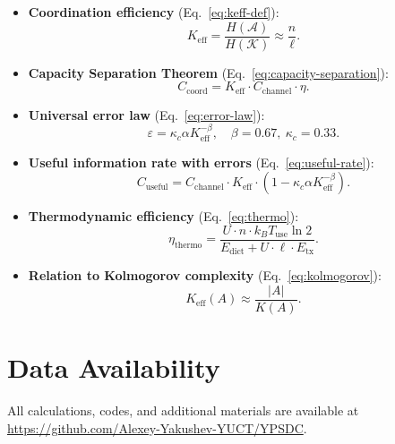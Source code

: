 \documentclass[12pt,a4paper]{article}
\theoremstyle{remark}
\newcommand{\Keff}{K_{\mathrm{eff}}}
\begin{document}
	\begin{itemize}
		\item \textbf{Coordination efficiency} (Eq.~\eqref{eq:keff-def}):
		\[
		\Keff = \frac{H(\mathcal{A})}{H(\mathcal{K})} \approx \frac{n}{\ell}.
		\]
		
		\item \textbf{Capacity Separation Theorem} (Eq.~\eqref{eq:capacity-separation}):
		\[
		C_{\text{coord}} = \Keff \cdot C_{\text{channel}} \cdot \eta.
		\]
		
		\item \textbf{Universal error law} (Eq.~\eqref{eq:error-law}):
		\[
		\varepsilon = \kappa_c \alpha \Keff^{-\beta}, \quad \beta = 0.67,\ \kappa_c = 0.33.
		\]
		
		\item \textbf{Useful information rate with errors} (Eq.~\eqref{eq:useful-rate}):
		\[
		C_{\text{useful}} = C_{\text{channel}} \cdot \Keff \cdot (1 - \kappa_c \alpha \Keff^{-\beta}).
		\]
		
		\item \textbf{Thermodynamic efficiency} (Eq.~\eqref{eq:thermo}):
		\[
		\eta_{\text{thermo}} = \frac{U \cdot n \cdot k_B T_{\text{use}} \ln 2}{E_{\text{dict}} + U \cdot \ell \cdot E_{\text{tx}}}.
		\]
		
		\item \textbf{Relation to Kolmogorov complexity} (Eq.~\eqref{eq:kolmogorov}):
		\[
		\Keff(A) \approx \frac{|A|}{K(A)}.
		\]
	\end{itemize}
	
	\section*{Data Availability}
	
	All calculations, codes, and additional materials are available at \url{https://github.com/Alexey-Yakushev-YUCT/YPSDC}.
	
\end{document}
